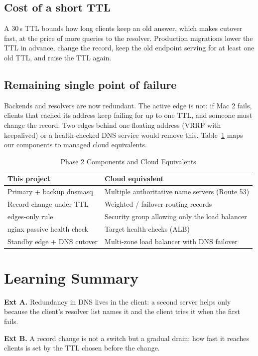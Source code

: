 \documentclass[conference]{IEEEtran}
\newcommand{\code}[1]{\texttt{\detokenize{#1}}}
\begin{document}
\subsection{Cost of a short TTL}
A 30\,s TTL bounds how long clients keep an old answer, which makes
cutover fast, at the price of more queries to the resolver. Production
migrations lower the TTL in advance, change the record, keep the old
endpoint serving for at least one old TTL, and raise the TTL again.

\subsection{Remaining single point of failure}
Backends and resolvers are now redundant. The active edge is not: if Mac 2
fails, clients that cached its address keep failing for up to one TTL,
and someone must change the record. Two edges behind one floating address
(VRRP with keepalived) or a health-checked DNS service would remove this.
Table~\ref{tab:cloud} maps our components to managed cloud equivalents.

\begin{table}[t]
\caption{Phase 2 Components and Cloud Equivalents}\label{tab:cloud}
\centering\footnotesize
\begin{tabular}{@{}p{3.3cm} p{4.4cm}@{}}
\toprule
This project & Cloud equivalent\\
\midrule
Primary + backup dnsmasq & Multiple authoritative name servers (Route 53)\\
Record change under TTL & Weighted / failover routing records\\
\code{pf} edges-only rule & Security group allowing only the load balancer\\
nginx passive health check & Target health checks (ALB)\\
Standby edge + DNS cutover & Multi-zone load balancer with DNS failover\\
\bottomrule
\end{tabular}
\end{table}

\section{Learning Summary}
\textbf{Ext A.} Redundancy in DNS lives in the client: a second server
helps only because the client's resolver list names it and the client
tries it when the first fails.

\textbf{Ext B.} A record change is not a switch but a gradual drain; how
fast it reaches clients is set by the TTL chosen before the change.
\end{document}
